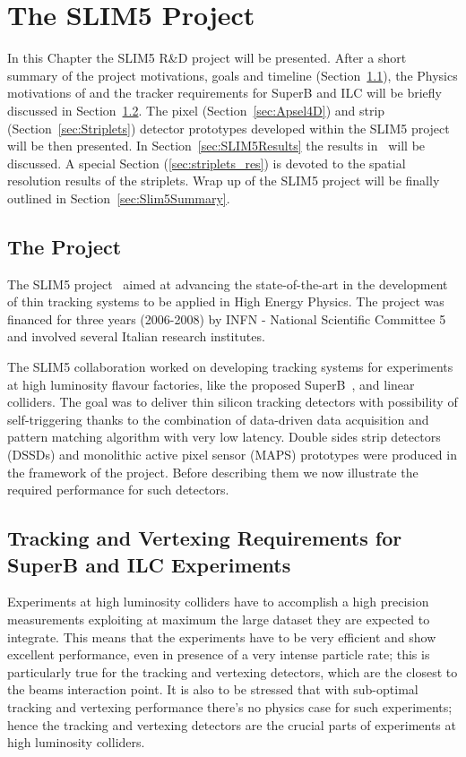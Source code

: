 \chapter{The SLIM5 Project}
\label{chap:SLIM5}
In this Chapter the SLIM5 R\&D project will be presented. After a short summary of the project 
motivations, goals and timeline (Section~\ref{sec:SLIM5Project}), the Physics motivations of 
and the tracker requirements for SuperB and ILC will be briefly discussed in Section~\ref{sec:HLExp}. 
The pixel  (Section~\ref{sec:Apsel4D}) and strip (Section~\ref{sec:Striplets}) 
detector prototypes developed 
within the SLIM5 project will be then presented. In Section~\ref{sec:SLIM5Results} the results 
in~\cite{BETTARINI2010942,BOMBEN2010159,NERI2010195} will be discussed. 
A special Section (\ref{sec:striplets_res}) is devoted to the spatial resolution results of the striplets. 
Wrap up of the SLIM5 project will be finally outlined in Section~\ref{sec:Slim5Summary}.


\section{The Project}
\label{sec:SLIM5Project}
The SLIM5 project~\cite{SLIM5:proj} aimed at advancing the state-of-the-art in the development of thin 
tracking systems to be applied in High Energy Physics. The project was financed for three years
 (2006-2008) by INFN - National Scientific Committee 5~\cite{INFN_V} and involved several 
 Italian research institutes. 
 
 The SLIM5 collaboration worked on developing tracking systems for experiments at 
 high luminosity flavour 
 factories, like the proposed SuperB~\cite{Baszczyk:2013xua}, and linear colliders. The goal was to deliver thin silicon tracking detectors with possibility 
 of self-triggering thanks to the combination of data-driven data acquisition and pattern matching 
 algorithm with very low latency. Double sides strip detectors (DSSDs) and monolithic active pixel sensor 
 (MAPS) prototypes were produced in the framework of the project.
Before describing them we now illustrate the required performance for such detectors. 

\section{Tracking and Vertexing Requirements for SuperB and ILC Experiments}
\label{sec:HLExp}
Experiments at high luminosity colliders have to accomplish a high precision measurements 
exploiting at maximum the large dataset they are expected to integrate. 
This means that the experiments have to be very efficient and show excellent performance, 
even in presence of a very intense particle rate; this is particularly true for the tracking and 
vertexing detectors, which are the closest to the beams interaction point. It is also to be stressed 
that with sub-optimal tracking and vertexing performance there's no physics case for such 
experiments; hence the tracking and vertexing detectors are the crucial parts of experiments at 
high luminosity colliders.

